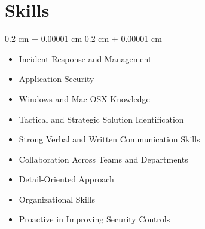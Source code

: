 \documentclass[10pt, letterpaper]{article}
\newenvironment{highlightsforbulletentries}{
    \begin{itemize}[
        topsep=0.10 cm,
        parsep=0.10 cm,
        partopsep=0pt,
        itemsep=0pt,
        leftmargin=10pt
    ]
}{
    \end{itemize}
} %
\newenvironment{onecolentry}{
    \begin{adjustwidth}{
        0.2 cm + 0.00001 cm
    }{
        0.2 cm + 0.00001 cm
    }
}{
    \end{adjustwidth}
} %
\begin{document}
    
    \section{Skills}

    \begin{onecolentry}
        \begin{highlightsforbulletentries}


        \item Incident Response and Management

        \item Application Security

        \item Windows and Mac OSX Knowledge

        \item Tactical and Strategic Solution Identification

        \item Strong Verbal and Written Communication Skills

        \item Collaboration Across Teams and Departments

        \item Detail-Oriented Approach

        \item Organizational Skills

        \item Proactive in Improving Security Controls


        \end{highlightsforbulletentries}
    \end{onecolentry}
\end{document}
